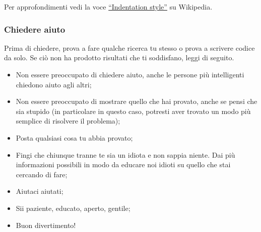 Per approfondimenti vedi la voce \href{https://en.wikipedia.org/wiki/Indentation_style}{``Indentation style''{\ExternalLink}} su Wikipedia.

\subsubsection*{Chiedere aiuto}

Prima di chiedere, prova a fare qualche ricerca tu stesso o prova a scrivere codice da solo.
Se ciò non ha prodotto risultati che ti soddisfano, leggi di seguito.

\begin{itemize}
	\item Non essere preoccupato di chiedere aiuto, anche le persone più intelligenti chiedono aiuto agli altri;
	\item Non essere preoccupato di mostrare quello che hai provato, anche se pensi che sia stupido (in particolare in questo caso, potresti aver trovato un modo più semplice di risolvere il problema);
	\item Posta qualsiasi cosa tu abbia provato;
	\item Fingi che chiunque tranne te sia un idiota e non sappia niente. Dai più informazioni possibili in modo da educare noi idioti su quello che stai cercando di fare;
	\item Aiutaci aiutati;
	\item Sii paziente, educato, aperto, gentile;
	\item Buon divertimento!
\end{itemize}
